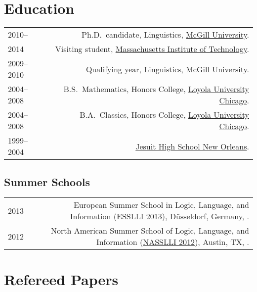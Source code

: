 \documentclass[a4paper]{article}
\makeatletter
\newcommand{\formatdatenoday}[2]{\mydatenoday\formatdate{0}{#1}{#2}}
\newcommand{\myvrule}{\color{lightgray}\vrule width 1.0pt}
\newenvironment{cvsection}{%
  \renewcommand{\arraystretch}{1.75}
  \begin{longtable}[l]{@{} L R @{}}
}{%
  \end{longtable}
}
\makeatother
\begin{document}

\section*{Education}

\begin{cvsection}
  2010-- & Ph.D.~candidate, Linguistics, \href{http://www.mcgill.ca/}{McGill
  University}. \\

  2014 & Visiting student,
  \href{http://www.mit.edu/}{Massachusetts Institute of Technology}. \\

  2009--2010 & Qualifying year, Linguistics,
  \href{http://www.mcgill.ca/}{McGill University}. \\

  2004--2008 & B.S.~Mathematics, Honors College,
  \href{http://www.luc.edu/}{Loyola University Chicago}. \\

  2004--2008 & B.A.~Classics, Honors College, \href{http://www.luc.edu/}{Loyola
  University Chicago}. \\

  1999--2004 & \href{http://www.jesuitnola.org/about/aboutindex.htm}{Jesuit
  High School New Orleans}. \\
\end{cvsection}

\vspace{-1ex}
\subsection*{Summer Schools}

\begin{cvsection}
  2013 & European Summer School in Logic, Language, and Information
  (\href{http://esslli2013.de/}{ESSLLI 2013}), D\"{u}sseldorf, Germany,
  \formatdatenoday{8}{2013}. \\

  2012 & North American Summer School of Logic, Language, and Information
  (\href{http://nasslli2012.com/}{NASSLLI 2012}), Austin, TX,
  \formatdatenoday{6}{2012}. \\
\end{cvsection}

\section*{Refereed Papers}
\end{document}

